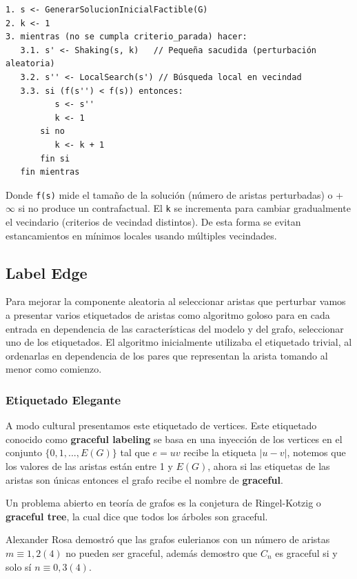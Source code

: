 \documentclass[a4paper]{article}
\begin{document}
\begin{verbatim}
1. s <- GenerarSolucionInicialFactible(G)
2. k <- 1
3. mientras (no se cumpla criterio_parada) hacer:
   3.1. s' <- Shaking(s, k)   // Pequeña sacudida (perturbación aleatoria)
   3.2. s'' <- LocalSearch(s') // Búsqueda local en vecindad
   3.3. si (f(s'') < f(s)) entonces:
          s <- s''
          k <- 1
       si no
          k <- k + 1
       fin si
   fin mientras
\end{verbatim}

Donde \texttt{f(s)} mide el tamaño de la solución (número de aristas perturbadas) o +\(\infty\) si no produce un contrafactual.  
El \texttt{k} se incrementa para cambiar gradualmente el vecindario (criterios de vecindad distintos).  
De esta forma se evitan estancamientos en mínimos locales usando múltiples vecindades.


\subsection{Label Edge}

Para mejorar la componente aleatoria al seleccionar aristas que perturbar vamos a presentar varios etiquetados de aristas como algoritmo goloso para en cada entrada en dependencia de las caracter\'isticas del modelo y del grafo, seleccionar uno de los etiquetados. El algoritmo inicialmente utilizaba el etiquetado trivial, al ordenarlas en dependencia de los pares que representan la arista tomando al menor como comienzo.

\subsubsection{Etiquetado Elegante}

A modo cultural presentamos este etiquetado de vertices. Este etiquetado conocido como \textbf{graceful labeling} se basa en una inyecci\'on de los vertices en el conjunto $\{0, 1, ..., E(G)\}$ tal que $e=uv$ recibe la etiqueta $|u - v|$, notemos que los valores de las aristas est\'an entre 1 y $E(G)$, ahora si las etiquetas de las aristas son \'unicas entonces el grafo recibe el nombre de \textbf{graceful}.

Un problema abierto en teor\'ia de grafos es la conjetura de Ringel-Kotzig o  \textbf{graceful tree}, la cual dice que todos los \'arboles son graceful.

Alexander Rosa demostr\'o que las grafos eulerianos con un n\'umero de aristas $m \equiv 1, 2 (4)$ no pueden ser graceful, adem\'as demostro que $C_n$ es graceful si y solo s\'i $n \equiv 0,3 (4)$.
\end{document}
